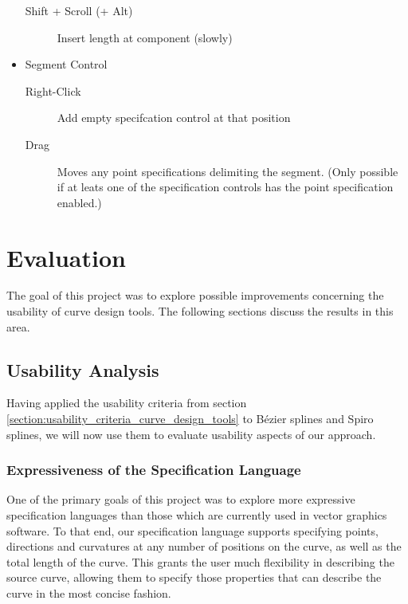 \documentclass[a4paper]{article}
\begin{document}
\begin{itemize}
\begin{description}
							\item[Shift + Scroll (+ Alt)] Insert length at component (slowly)
						\end{description}
						\item Segment Control
						\begin{description}
							\item[Right-Click] Add empty specifcation control at that position
							\item[Drag] Moves any point specifications delimiting the segment. (Only possible if at leats one of the specification controls has the point specification enabled.)
						\end{description}
					\end{itemize}
		
	\section{Evaluation}
	\label{section:evaluation}

		The goal of this project was to explore possible improvements concerning the usability of curve design tools. The following sections discuss the results in this area.

		\subsection{Usability Analysis}
		\label{section:usability_analysis}

			Having applied the usability criteria from section \ref{section:usability_criteria_curve_design_tools} to Bézier splines and Spiro splines, we will now use them to evaluate usability aspects of our approach.

			\subsubsection{Expressiveness of the Specification Language}
			\label{section:expressiveness_specification_language}

				One of the primary goals of this project was to explore more expressive specification languages than those which are currently used in vector graphics software. To that end, our specification language supports specifying points, directions and curvatures at any number of positions on the curve, as well as the total length of the curve. This grants the user much flexibility in describing the source curve, allowing them to specify those properties that can describe the curve in the most concise fashion.
\end{document}
